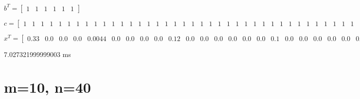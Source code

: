 \documentclass[8pt]{article}
\begin{document}
\footnotesize
$ b^T =
\begin{bmatrix}
  1  &  1  &  1  &  1  &  1  &  1 
\end{bmatrix}
$


\footnotesize
$ c =
\begin{bmatrix}
  1  &  1  &  1  &  1  &  1  &  1  &  1  &  1  &  1  &  1  &  1  &  1  &  1  &  1  &  1  &  1  &  1  &  1  &  1  &  1  &  1  &  1  &  1  &  1  &  1  &  1  &  1  &  1  &  1  &  1  &  1  &  1  &  1  &  1  &  1  &  1  &  1  &  1  &  1  &  1 
\end{bmatrix}
$


\footnotesize
$ x^T =
\begin{bmatrix}
  0.33 &  0.0 &  0.0 &  0.0 &  0.0044 &  0.0 &  0.0 &  0.0 &  0.0 &  0.12 &  0.0 &  0.0 &  0.0 &  0.0 &  0.0 &  0.0 &  0.1 &  0.0 &  0.0 &  0.0 &  0.0 &  0.0 &  0.04 &  0.0 &  0.0 &  0.0 &  0.0 &  0.0 &  0.0 &  0.019 &  0.0 &  0.0 &  0.0 &  0.0 &  0.0 &  0.0 &  0.0 &  0.0 &  0.0 &  0.0
\end{bmatrix}
$


7.027321999999003  ms


\section{ m=10, n=40 }
\end{document}
